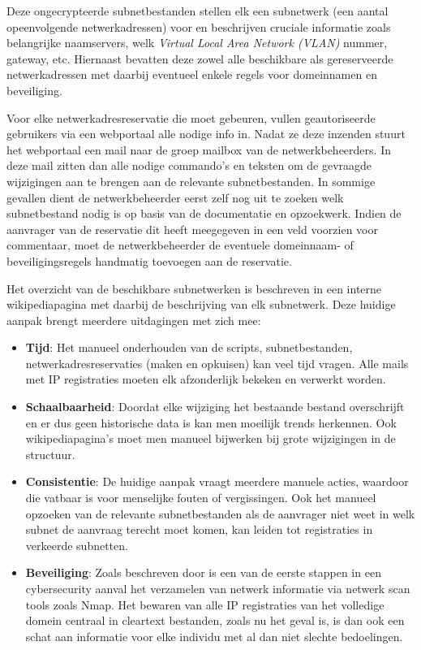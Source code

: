 Deze ongecrypteerde subnetbestanden stellen elk een subnetwerk (een aantal opeenvolgende netwerkadressen) voor en beschrijven cruciale informatie zoals belangrijke naamservers, welk \textit{Virtual Local Area Network (VLAN)} nummer, gateway, etc. Hiernaast bevatten deze zowel alle beschikbare als gereserveerde netwerkadressen met daarbij eventueel enkele regels voor domeinnamen en beveiliging.

Voor elke netwerkadresreservatie die moet gebeuren, vullen geautoriseerde gebruikers via een webportaal alle nodige info in.
Nadat ze deze inzenden stuurt het webportaal een mail naar de groep mailbox van de netwerkbeheerders.
In deze mail zitten dan alle nodige commando's en teksten om de gevraagde wijzigingen aan te brengen aan de relevante subnetbestanden. In sommige gevallen dient de netwerkbeheerder eerst zelf nog uit te zoeken welk subnetbestand nodig is op basis van de documentatie en opzoekwerk. Indien de aanvrager van de reservatie dit heeft meegegeven in een veld voorzien voor commentaar, moet de netwerkbeheerder de eventuele domeinnaam- of beveiligingsregels handmatig toevoegen aan de reservatie.

Het overzicht van de beschikbare subnetwerken is beschreven in een interne wikipediapagina met daarbij de beschrijving van elk subnetwerk. Deze huidige aanpak brengt meerdere uitdagingen met zich mee:
\begin{itemize}
    \item \textbf{Tijd}: Het manueel onderhouden van de scripts, subnetbestanden, netwerkadresreservaties (maken en opkuisen) kan veel tijd vragen. Alle mails met IP registraties moeten elk afzonderlijk bekeken en verwerkt worden.
    \item \textbf{Schaalbaarheid}: Doordat elke wijziging het bestaande bestand overschrijft en er dus geen historische data is kan men moeilijk trends herkennen. Ook wikipediapagina's moet men manueel bijwerken bij grote wijzigingen in de structuur.
    \item \textbf{Consistentie}: De huidige aanpak vraagt meerdere manuele acties, waardoor die vatbaar is voor menselijke fouten of vergissingen. Ook het manueel opzoeken van de relevante subnetbestanden als de aanvrager niet weet in welk subnet de aanvraag terecht moet komen, kan leiden tot registraties in verkeerde subnetten.  
    \item \textbf{Beveiliging}: Zoals beschreven door \textcite{Liao2020} is een van de eerste stappen in een cybersecurity aanval het verzamelen van netwerk informatie via netwerk scan tools zoals Nmap. Het bewaren van alle IP registraties van het volledige domein centraal in cleartext bestanden, zoals nu het geval is, is dan ook een schat aan informatie voor elke individu met al dan niet slechte bedoelingen.
\end{itemize}

